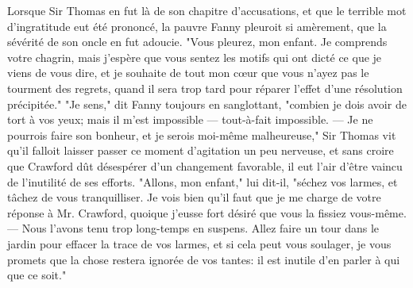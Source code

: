 Lorsque Sir Thomas en fut là de son chapitre d'accusations, et que le terrible mot d'ingratitude eut été prononcé, la pauvre Fanny pleuroit si amèrement, que la sévérité de son oncle en fut adoucie. "Vous pleurez, mon enfant. Je comprends votre chagrin, mais j'espère que vous sentez les motifs qui ont dicté ce que je viens de vous dire, et je souhaite de tout mon cœur que vous n'ayez pas le tourment des regrets, quand il sera trop tard pour réparer l'effet d'une résolution précipitée."
"Je sens," dit Fanny toujours en sanglottant, "combien je dois avoir de tort à vos yeux; mais il m'est impossible — tout-à-fait impossible. — Je ne pourrois faire son bonheur, et je serois moi-même malheureuse,"\setcounter{page}{273} Sir Thomas vit qu'il falloit laisser passer ce moment d'agitation un peu nerveuse, et sans croire que Crawford dût désespérer d'un changement favorable, il eut l'air d'être vaincu de l'inutilité de ses efforts.
"Allons, mon enfant," lui dit-il, "séchez vos larmes, et tâchez de vous tranquilliser. Je vois bien qu'il faut que je me charge de votre réponse à Mr. Crawford, quoique j'eusse fort désiré que vous la fissiez vous-même. — Nous l'avons tenu trop long-temps en suspens. Allez faire un tour dans le jardin pour effacer la trace de vos larmes, et si cela peut vous soulager, je vous promets que la chose restera ignorée de vos tantes: il est inutile d'en parler à qui que ce soit."